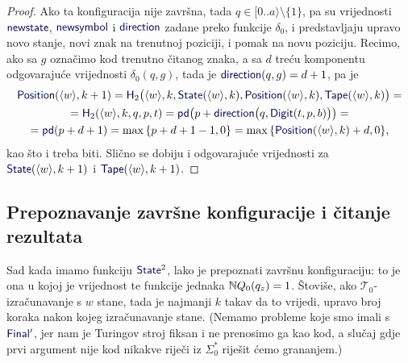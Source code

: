 \begin{proof}
Ako ta konfiguracija nije završna, tada $q\in[0..a\rangle\setminus\{1\}$, pa su vrijednosti $\f{newstate}$, $\f{newsymbol}$ i $\f{direction}$ zadane preko funkcije $\delta_0$, i predstavljaju upravo novo stanje, novi znak na trenutnoj poziciji, i pomak na novu poziciju. Recimo, ako sa $g$ označimo kod trenutno čitanog znaka, a sa $d$ treću komponentu odgovarajuće vrijednosti $\delta_0(q,g)$, tada je $\f{direction}(q,g)=d+1$, pa je
\begin{multline}
    \f{Position}(\kr w,k+1)=\f H_2\bigl(\kr w,k,\f{State}(\kr w,k),\f{Position}(\kr w, k),\f{Tape}(\kr w,k)\bigr)=\\
    =\f H_2(\kr w,k,q,p,t)=
    \f{pd}\bigl(p+\f{direction}\bigl(q,\f{Digit}(t,p,b)\bigr)\bigr)=\\
    =\f{pd}(p+d+1)=\max\,\{p+d+1-1,0\}=\max\,\{\f{Position}(\kr w,k)+d,0\}\text,
\end{multline}
kao što i treba biti. Slično se dobiju i odgovarajuće vrijednosti za $\f{State}(\kr w,k+1)$ i $\f{Tape}(\kr w,k+1)$.
\end{proof}

\subsection{Prepoznavanje završne konfiguracije i čitanje rezultata}

Sad kada imamo funkciju $\f{State}^2$, lako je prepoznati završnu konfiguraciju: to je ona u kojoj je vrijednost te funkcije jednaka ${\mathbb N} Q_0(q_z)=1$. Štoviše, ako $\mathcal T_0$-izračunavanje s $w$ stane, tada je najmanji $k$ takav da to vrijedi, upravo broj koraka nakon kojeg izračunavanje stane. (Nemamo probleme koje smo imali s $\f{Final}'$, jer nam je Turingov stroj fiksan i ne prenosimo ga kao kod, a slučaj gdje prvi argument nije kod nikakve riječi iz $\Sigma_0^*$ riješit ćemo grananjem.)

